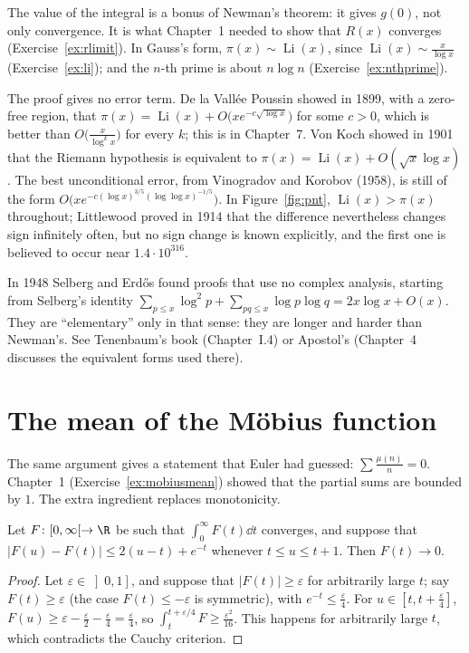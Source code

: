 The value of the integral is a bonus of Newman's theorem: it gives $g(0)$, not only convergence. It is what Chapter~1 needed to show that $R(x)$ converges
(Exercise~\ref{ex:rlimit}). In Gauss's form, $\pi(x)\sim\operatorname{Li}(x)$, since $\operatorname{Li}(x)\sim\frac x{\log x}$ (Exercise~\ref{ex:li}); and the $n$-th prime is about $n\log n$
(Exercise~\ref{ex:nthprime}).

\begin{remark}
The proof gives no error term. De la Vallée Poussin showed in 1899, with a zero-free region, that $\pi(x)=\operatorname{Li}(x)+O\bigl(xe^{-c\sqrt{\log x}}\bigr)$ for some $c>0$, which is
better than $O\bigl(\frac x{\log^kx}\bigr)$ for every $k$; this is in Chapter~7. Von Koch showed in 1901 that the Riemann hypothesis is equivalent to
$\pi(x)=\operatorname{Li}(x)+O(\sqrt x\log x)$. The best unconditional error, from Vinogradov and Korobov (1958), is still of the form $O\bigl(xe^{-c(\log x)^{3/5}(\log\log x)^{-1/5}}\bigr)$.
In Figure~\ref{fig:pnt}, $\operatorname{Li}(x)>\pi(x)$ throughout; Littlewood proved in 1914 that the difference nevertheless changes sign infinitely often, but no sign change is known
explicitly, and the first one is believed to occur near $1.4\cdot10^{316}$.
\end{remark}

\begin{remark}
In 1948 Selberg and Erdős found proofs that use no complex analysis, starting from Selberg's identity $\sum_{p\le x}\log^2p+\sum_{pq\le x}\log p\log q=2x\log x+O(x)$. They are
``elementary'' only in that sense: they are longer and harder than Newman's. See Tenenbaum's book (Chapter~I.4) or Apostol's (Chapter~4 discusses the equivalent forms used there).
\end{remark}

\section{The mean of the Möbius function}

The same argument gives a statement that Euler had guessed: $\sum\frac{\mu(n)}n=0$. Chapter~1 (Exercise~\ref{ex:mobiusmean}) showed that the partial sums are bounded by $1$. The extra
ingredient replaces monotonicity.

\begin{lemma}\label{lem:slowosc}
Let $F\colon[0,\infty[\to\R$ be such that $\int_0^\infty F(t)\dd t$ converges, and suppose that $|F(u)-F(t)|\le2(u-t)+e^{-t}$ whenever $t\le u\le t+1$. Then $F(t)\to0$.
\end{lemma}
\begin{proof}
Let $\varepsilon\in\left]0,1\right]$, and suppose that $|F(t)|\ge\varepsilon$ for arbitrarily large $t$; say $F(t)\ge\varepsilon$ (the case $F(t)\le-\varepsilon$ is symmetric), with $e^{-t}\le\frac\varepsilon4$. For
$u\in[t,t+\frac\varepsilon4]$, $F(u)\ge\varepsilon-\frac\varepsilon2-\frac\varepsilon4=\frac\varepsilon4$, so $\int_t^{t+\varepsilon/4}F\ge\frac{\varepsilon^2}{16}$. This happens for arbitrarily large $t$, which contradicts the Cauchy criterion.
\end{proof}

